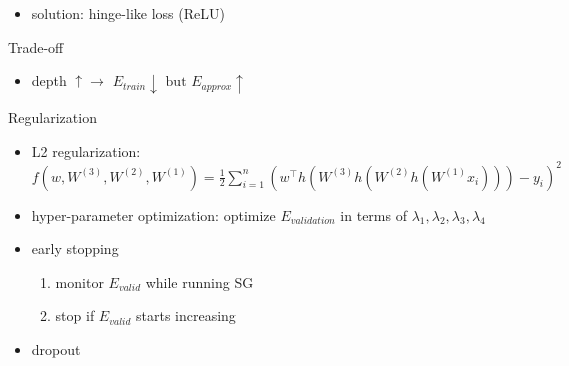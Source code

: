 \documentclass[10pt,landscape,a4paper]{article}
\begin{document}
\begin{multicols*}{5}
\begin{itemize}
    \item solution: hinge-like loss (ReLU)
\end{itemize}
Trade-off
\begin{itemize}
    \item depth \(\uparrow \rightarrow \) \(E_{train} \downarrow \text{ but } E_{approx} \uparrow\)
\end{itemize}
Regularization
\begin{itemize}
    \item L2 regularization: \(f(w, W^{(3)}, W^{(2)}, W^{(1)}) = \frac{1}{2} \sum\limits_{i=1}^{n} (w^\intercal h(W^{(3)} h(W^{(2)} h(W^{(1)} x_i))) - y_i)^2\)
    \item hyper-parameter optimization: optimize \(E_{validation}\) in terms of \(\lambda_1, \lambda_2, \lambda_3, \lambda_4\)
    \item early stopping
    \begin{enumerate}
        \item monitor \(E_{valid}\) while running SG
        \item stop if \(E_{valid}\) starts increasing
    \end{enumerate}
    \item dropout
\end{itemize}


\end{multicols*}
\end{document}
